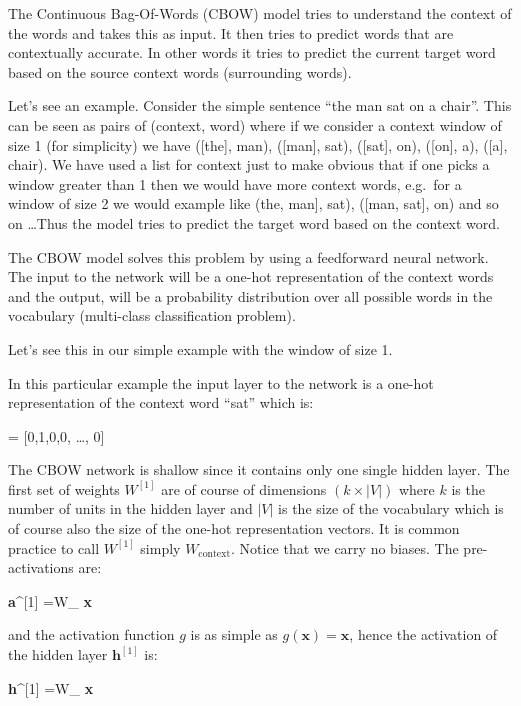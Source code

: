 The Continuous Bag-Of-Words (CBOW) model tries to understand the context of the words and takes this as input. It
then tries to predict words that are contextually accurate. In other words it tries to predict the current target
word based on the source context words (surrounding words).

\be
Let's see an example. Consider the simple sentence ``the man sat on a chair''. This can be seen as pairs of (context,
word) where if we consider a context window of size 1 (for simplicity) we have ([the], man), ([man], sat), ([sat],
on), ([on], a), ([a], chair). We have used a list for context just to make obvious that if one picks a window greater
than 1 then we would have more context words, e.g.\ for a window of size 2 we would example like (the, man], sat),
([man, sat], on) and so on \ldots Thus the model tries to predict the target word based on the context word.
\ee

The CBOW model solves this problem by using a feedforward neural network. The input to the network will be a one-hot
representation of the context words and the output, will be a probability distribution over all possible words in the
vocabulary (multi-class classification problem).

\be
Let's see this in our simple example with the window of size 1.

\vspace{10pt}


In this particular example the input layer to the network is a one-hot representation of the context word ``sat''
which is:

\bse
{} = [0,1,0,0, \ldots, 0]
\ese
\ee

The CBOW network is shallow since it contains only one single hidden layer. The first set of weights $W^{[1]}$ are of
course of dimensions $(k \times |V|)$ where $k$ is the number of units in the hidden layer and $|V|$ is the size of
the vocabulary which is of course also the size of the one-hot representation vectors. It is common practice to call
$W^{[1]}$ simply $W_{\text{context}}$. Notice that we carry no biases. The pre-activations are:

\bse
\textbf{a}^{[1]} =W_{} \cdot \textbf{x}
\ese

and the activation function $g$ is as simple as $g(\textbf{x}) = \textbf{x}$, hence the activation of the hidden
layer $\textbf{h}^{[1]}$ is:

\bse
\textbf{h}^{[1]} =W_{} \cdot \textbf{x}
\ese

